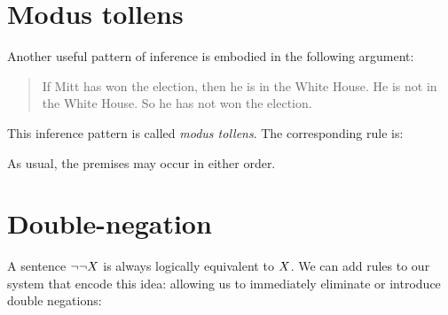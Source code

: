 \section{Modus tollens}
Another useful pattern of inference is embodied in the following argument:
	\begin{quote}
		If Mitt has won the election, then he is in the White House. He is not in the White House. So he has not won the election.
	\end{quote}
This inference pattern is called \emph{modus tollens}. The corresponding rule is:
\begin{highlighted}\begin{fitchproof}
\end{fitchproof}\end{highlighted}
As usual, the premises may occur in either order.


\section{Double-negation}
A sentence $\neg\neg X$ is always logically equivalent to $X$.
We can add rules to our system that encode this idea: allowing us to immediately eliminate or introduce double negations:
\begin{highlighted}
\begin{fitchproof}
\end{fitchproof}
\end{highlighted}
\begin{highlighted}
\begin{fitchproof}
\end{fitchproof}
\end{highlighted}
%
%


